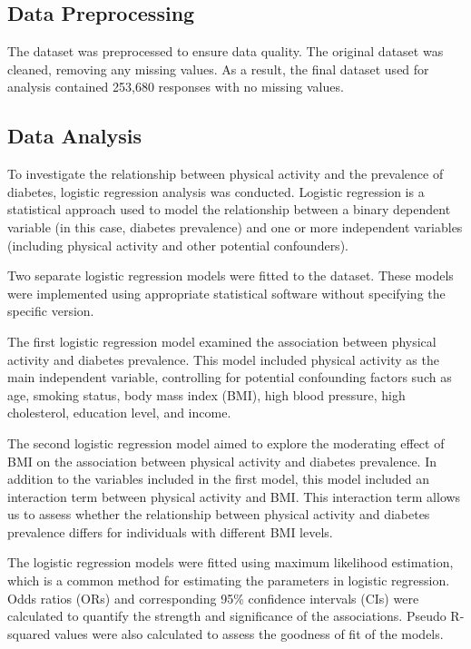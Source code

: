 \documentclass[11pt]{article}
\begin{document}
\subsection*{Data Preprocessing}
The dataset was preprocessed to ensure data quality. The original dataset was cleaned, removing any missing values. As a result, the final dataset used for analysis contained 253,680 responses with no missing values.

\subsection*{Data Analysis}
To investigate the relationship between physical activity and the prevalence of diabetes, logistic regression analysis was conducted. Logistic regression is a statistical approach used to model the relationship between a binary dependent variable (in this case, diabetes prevalence) and one or more independent variables (including physical activity and other potential confounders).

Two separate logistic regression models were fitted to the dataset. These models were implemented using appropriate statistical software without specifying the specific version.

The first logistic regression model examined the association between physical activity and diabetes prevalence. This model included physical activity as the main independent variable, controlling for potential confounding factors such as age, smoking status, body mass index (BMI), high blood pressure, high cholesterol, education level, and income.

The second logistic regression model aimed to explore the moderating effect of BMI on the association between physical activity and diabetes prevalence. In addition to the variables included in the first model, this model included an interaction term between physical activity and BMI. This interaction term allows us to assess whether the relationship between physical activity and diabetes prevalence differs for individuals with different BMI levels.

The logistic regression models were fitted using maximum likelihood estimation, which is a common method for estimating the parameters in logistic regression. Odds ratios (ORs) and corresponding 95\% confidence intervals (CIs) were calculated to quantify the strength and significance of the associations. Pseudo R-squared values were also calculated to assess the goodness of fit of the models.
\end{document}
